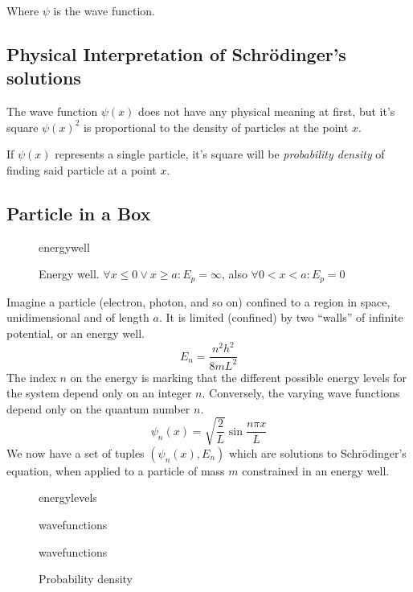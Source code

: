 \documentclass{article}[10pt]
\begin{document}
Where $\psi$ is the wave function.

\subsection{Physical Interpretation of Schrödinger's solutions}
The wave function $\psi(x)$ does not have any physical meaning at first, but
it's square $\psi{(x)}^2$ is proportional to the density of particles at the point
$x$.

If $\psi(x)$ represents a single particle, it's square will be \emph{probability density}
of finding said particle at a point $x$.

\subsection{Particle in a Box}
\begin{figure}
	{energywell}
	\caption{Energy well. $\forall x\le 0 \vee x\ge a : E_p=\infty$, also $\forall 0<x<a : E_p=0 $}\label{fig:energywell}
\end{figure}
Imagine a particle (electron, photon, and so on) confined to a region in space,
unidimensional and of length $a$. It is limited (confined) by two ``walls'' of
infinite potential, or an energy well.
\begin{equation*}
	E_n=\frac{n^2h^2}{8mL^2}
\end{equation*}
The index $n$ on the energy is marking that the different possible energy levels
for the system depend only on an integer $n$. Conversely, the varying wave
functions depend only on the quantum number $n$.
\begin{equation*}
	\psi_n(x) = \sqrt{\frac{2}{L}}\sin{\frac{n\pi x}{L}}
\end{equation*}
We now have a set of tuples $(\psi_n(x), E_n)$ which are solutions to
Schrödinger's equation, when applied to a particle of mass $m$ constrained in an
energy well.
\vspace{2.5cm}
\begin{figure}[H]
	\centering
	\begin{minipage}{.5\textwidth}
		\centering
		{energylevels}
		\label{fig:energylevels}
	\end{minipage}%
	\begin{minipage}{.5\textwidth}
		\centering
		{wavefunctions}
		\label{fig:wavefunctions}
	\end{minipage}
\end{figure}
\clearpage
\begin{figure}
	\centering
	{wavefunctions}
	\caption{Probability density}
\end{figure}
\end{document}
